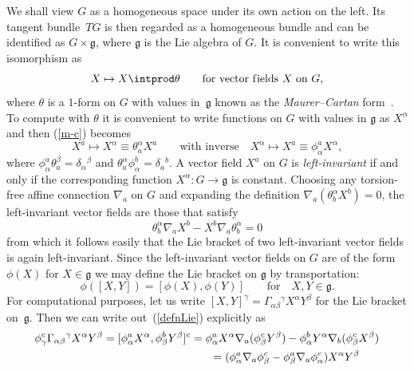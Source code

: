 We shall view $G$ as a homogeneous space under its own action on the left. Its
tangent bundle~$TG$ is then regarded as a homogeneous bundle and can be
identif\/ied as $G\times{\mathfrak{g}}$, where ${\mathfrak{g}}$ is the Lie
algebra of $G$. It is convenient to write this isomorphism as
\begin{equation}\label{m-c}
X\mapsto X\intprod\theta \qquad\mbox{for vector f\/ields $X$ on $G$},
\end{equation}
where $\theta$ is a $1$-form on $G$ with values in~${\mathfrak{g}}$ known as
the {\em Maurer--Cartan\/} form~\cite{ss}. To compute with $\theta$ it is
convenient to write functions on $G$ with values in ${\mathfrak{g}}$ as
$X^\alpha$ and then (\ref{m-c}) becomes
\[
X^a\mapsto X^\alpha\equiv\theta_a^\alpha X^a\qquad \mbox{with inverse}
\quad X^\alpha\mapsto X^a\equiv\phi_\alpha^a X^\alpha,
\]
where $\phi_\alpha^a\theta^\beta_a=\delta_\alpha{}^\beta$ and $\theta_a^\alpha\phi_\alpha^b=\delta_a{}^b$.
A vector f\/ield $X^a$ on $G$ is {\em left-invariant\/} if and only if the
corresponding function $X^\alpha:G\to{\mathfrak{g}}$ is constant. Choosing any
torsion-free af\/f\/ine connection $\nabla_a$ on $G$ and expanding the def\/inition
$\nabla_a(\theta_b^\alpha X^b)=0$, the left-invariant vector f\/ields are those
that satisfy
\[\theta_b^\alpha \nabla_aX^b-X^b \nabla_a\theta_b^\alpha=0\]
from which it follows easily that the Lie bracket of two left-invariant
vector f\/ields is again left-invariant.
Since the left-invariant vector f\/ields on $G$ are of the form $\phi(X)$ for
$X\in{\mathfrak{g}}$ we may def\/ine the Lie bracket
on ${\mathfrak{g}}$ by transportation: %
\begin{equation}\label{defnLie}
\phi([X,Y])=[\phi(X),\phi(Y)]\qquad\mbox{for} \quad X,Y\in{\mathfrak{g}}.
\end{equation}
For computational purposes, let us write
$[X,Y]^\gamma=\Gamma_{\alpha\beta}{}^\gamma X^\alpha Y^\beta$ for the Lie
bracket on~${\mathfrak{g}}$. Then we can write out~(\ref{defnLie}) explicitly
as
 \begin{gather*}
\phi_\gamma^c\Gamma_{\alpha\beta}{}^\gamma X^\alpha Y^\beta =
[\phi_\alpha^a X^\alpha,\phi_\beta^b Y^\beta]^c
 = \phi_\alpha^a X^\alpha \nabla_a(\phi_\beta^c Y^\beta)-
\phi_\alpha^b Y^\alpha \nabla_b(\phi_\beta^c X^\beta)\\
\hphantom{\phi_\gamma^c\Gamma_{\alpha\beta}{}^\gamma X^\alpha Y^\beta =
[\phi_\alpha^a X^\alpha,\phi_\beta^b Y^\beta]^c}{}
 = (\phi_\alpha^a \nabla_a\phi_\beta^c-\phi_\beta^a \nabla_a\phi_\alpha^c)
X^\alpha Y^\beta
\end{gather*}
